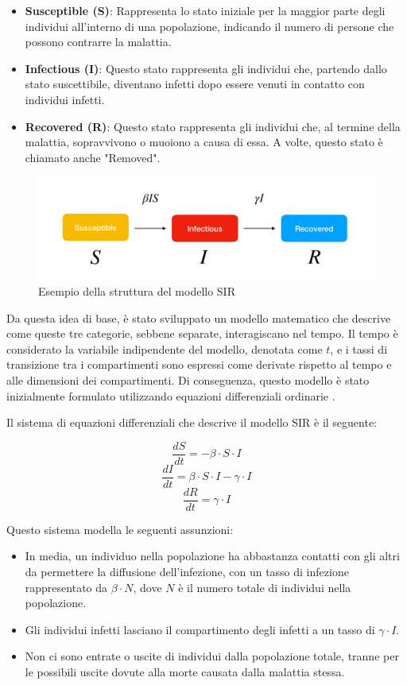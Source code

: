 \begin{itemize}
    \item \textbf{Susceptible (S)}: Rappresenta lo stato iniziale per la maggior parte degli individui all'interno di una popolazione, indicando il numero di persone che possono contrarre la malattia.
    \item \textbf{Infectious (I)}: Questo stato rappresenta gli individui che, partendo dallo stato suscettibile, diventano infetti dopo essere venuti in contatto con individui infetti.
    \item \textbf{Recovered (R)}: Questo stato rappresenta gli individui che, al termine della malattia, sopravvivono o muoiono a causa di essa. A volte, questo stato è chiamato anche "Removed".
\end{itemize}

\begin{figure}[h]
    \includegraphics[width=\linewidth]{img/sir.png}
    \caption{Esempio della struttura del modello SIR} 
    \label{fig:SIR_Structure}
\end{figure}

Da questa idea di base, è stato sviluppato un modello matematico che 
descrive come queste tre categorie, sebbene separate, interagiscano 
nel tempo. Il tempo è considerato la variabile indipendente del modello, 
denotata come $t$, e i tassi di transizione tra i compartimenti sono 
espressi come derivate rispetto al tempo e alle dimensioni dei 
compartimenti. Di conseguenza, questo modello è stato inizialmente 
formulato utilizzando equazioni differenziali ordinarie \cite{Brauer2008}.

Il sistema di equazioni differenziali che descrive il modello SIR è il seguente:

\[ \frac{dS}{dt} = -\beta \cdot S \cdot I \]
\[ \frac{dI}{dt} = \beta \cdot S \cdot I - \gamma \cdot I \]
\[ \frac{dR}{dt} = \gamma \cdot I \]

Questo sistema modella le seguenti assunzioni:

\begin{itemize}
    \item In media, un individuo nella popolazione ha abbastanza contatti 
    con gli altri da permettere la diffusione dell'infezione, con un tasso 
    di infezione rappresentato da $\beta \cdot N$, dove $N$ è il numero 
    totale di individui nella popolazione.
    \item Gli individui infetti lasciano il compartimento degli infetti a 
    un tasso di $\gamma \cdot I$.
    \item Non ci sono entrate o uscite di individui dalla popolazione 
    totale, tranne per le possibili uscite dovute alla morte causata 
    dalla malattia stessa.
\end{itemize}

